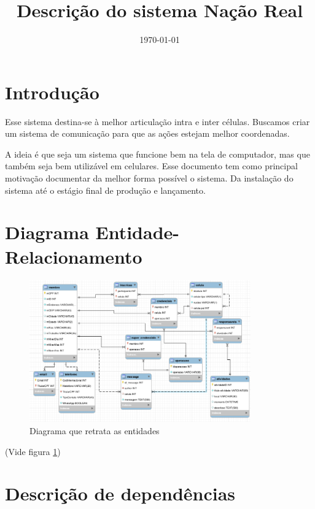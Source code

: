 \documentclass[11pt]{article}
\title{Descrição do sistema Nação Real}
\date{\today}
\begin{document}
    \maketitle
    \tableofcontents
    \listoffigures
    \lstlistoflistings
    \newpage

    \section{Introdução}
    \label{s-intro}

    Esse sistema destina-se à melhor articulação intra e inter células. Buscamos criar um sistema de comunicação para
    que as ações estejam melhor coordenadas.

    A ideia é que seja um sistema que funcione bem na tela de computador, mas que também seja bem utilizável em celulares.
    Esse documento tem como principal motivação documentar da melhor forma possível o sistema. Da instalação do sistema até
    o estágio final de produção e lançamento.


    \section[DER]{Diagrama Entidade-Relacionamento}
    \label{DER}

    \begin{figure}
        \centering
        \includegraphics[width=0.85\textwidth]{bd.png}
        \caption{Diagrama que retrata as entidades}
        \label{fig:der}
    \end{figure}

    (Vide figura \ref{fig:der})

    \section[Dependências]{Descrição de dependências}
\end{document}
